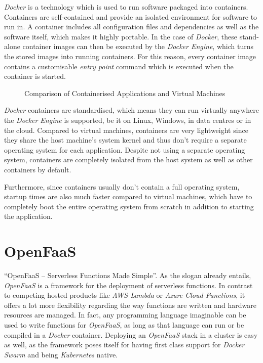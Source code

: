 \textit{Docker} is a technology which is used to run software packaged into containers. Containers are
self-contained and provide an isolated environment for software to run in. A container includes all
configuration files and dependencies as well as the software itself, which makes it highly portable.
In the case of \textit{Docker}, these stand-alone container images can then be executed by the
\textit{Docker Engine}, which turns the stored images into running containers. For this reason,
every container image contains a customisable \textit{entry point} command which is executed when
the container is started.

\begin{figure}[H]
  \centering
  \caption{Comparison of Containerised Applications and Virtual Machines \cite{docker-container}}
\end{figure}

\textit{Docker} containers are standardised, which means they can run virtually anywhere the
\textit{Docker Engine} is supported, be it on Linux, Windows, in data centres or in the cloud.
Compared to virtual machines, containers are very lightweight since they share the host machine's
system kernel and thus don't require a separate operating system for each application. Despite not
using a separate operating system, containers are completely isolated from the host system as well
as other containers by default.

Furthermore, since containers usually don't contain a full operating system, startup times are also
much faster compared to virtual machines, which have to completely boot the entire operating system
from scratch in addition to starting the application. \cite{docker-container}

\section{OpenFaaS}

“OpenFaaS – Serverless Functions Made Simple”. As the slogan already entails, \textit{OpenFaaS} is a
framework for the deployment of serverless functions. In contrast to competing hosted products like
\textit{AWS Lambda} or \textit{Azure Cloud Functions}, it offers a lot more flexibility regarding
the way functions are written and hardware resources are managed. In fact, any programming language
imaginable can be used to write functions for \textit{OpenFaaS}, as long as that language can run or
be compiled in a \textit{Docker} container. Deploying an \textit{OpenFaaS} stack in a cluster is
easy as well, as the framework poses itself for having first class support for \textit{Docker Swarm}
and being \textit{Kubernetes} native. \cite{openfaas-docs}

